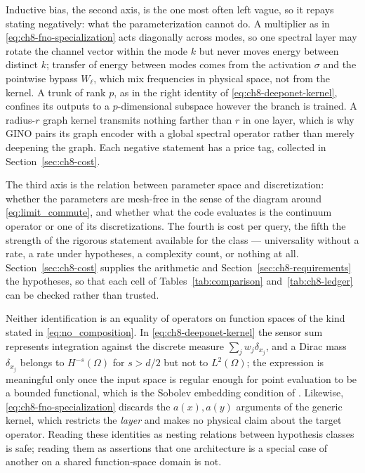 Inductive bias, the second axis, is the one most often left vague, so it repays stating negatively: what the parameterization cannot do. A multiplier as in \eqref{eq:ch8-fno-specialization} acts diagonally across modes, so one spectral layer may rotate the channel vector within the mode $k$ but never moves energy between distinct $k$; transfer of energy between modes comes from the activation $\sigma$ and the pointwise bypass $W_\ell$, which mix frequencies in physical space, not from the kernel. A trunk of rank $p$, as in the right identity of \eqref{eq:ch8-deeponet-kernel}, confines its outputs to a $p$-dimensional subspace however the branch is trained. A radius-$r$ graph kernel transmits nothing farther than $r$ in one layer, which is why GINO pairs its graph encoder with a global spectral operator rather than merely deepening the graph. Each negative statement has a price tag, collected in Section~\ref{sec:ch8-cost}.

The third axis is the relation between parameter space and discretization: whether the parameters are mesh-free in the sense of the diagram around \eqref{eq:limit_commute}, and whether what the code evaluates is the continuum operator or one of its discretizations. The fourth is cost per query, the fifth the strength of the rigorous statement available for the class --- universality without a rate, a rate under hypotheses, a complexity count, or nothing at all. Section~\ref{sec:ch8-cost} supplies the arithmetic and Section~\ref{sec:ch8-requirements} the hypotheses, so that each cell of Tables~\ref{tab:comparison} and~\ref{tab:ch8-ledger} can be checked rather than trusted.

\begin{remark}
\label{rmk:ch8-inclusions}
Neither identification is an equality of operators on function spaces of the kind stated in \eqref{eq:no_composition}. In \eqref{eq:ch8-deeponet-kernel} the sensor sum represents integration against the discrete measure $\sum_j w_j\delta_{x_j}$, and a Dirac mass $\delta_{x_j}$ belongs to $H^{-s}(\Omega)$ for $s>d/2$ but not to $L^2(\Omega)$; the expression is meaningful only once the input space is regular enough for point evaluation to be a bounded functional, which is the Sobolev embedding condition of .  Likewise, \eqref{eq:ch8-fno-specialization} discards the $a(x),a(y)$ arguments of the generic kernel, which restricts the \emph{layer} and makes no physical claim about the target operator. Reading these identities as nesting relations between hypothesis classes is safe; reading them as assertions that one architecture is a special case of another on a shared function-space domain is not.
\end{remark}

